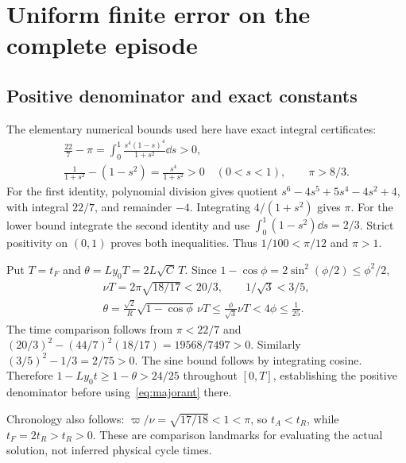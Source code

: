 \section{Uniform finite error on the complete episode}\label{sec:error}
\subsection{Positive denominator and exact constants}\label{sec:constants}
The elementary numerical bounds used here have exact integral certificates:
\begin{equation}\label{eq:pibounds}%
\begin{gathered}
 \frac{22}{7}-\pi
 =\int_0^1\frac{s^4(1-s)^4}{1+s^2}\dd s>0,\\
 \frac1{1+s^2}-(1-s^2)=\frac{s^4}{1+s^2}>0
 \quad(0<s<1),\qquad \pi>8/3 .
\end{gathered}
\end{equation}
For the first identity, polynomial division gives quotient
$s^6-4s^5+5s^4-4s^2+4$, with integral $22/7$, and remainder $-4$.
Integrating $4/(1+s^2)$ gives $\pi$. For the lower bound integrate the second identity and use $\int_0^1(1-s^2)\dd s=2/3$. Strict positivity on $(0,1)$ proves both inequalities. Thus $1/100<\pi/12$ and $\pi>1$.

Put $T=t_F$ and $\theta=Ly_0T=2L\sqrt C\,T$. Since
$1-\cos\phi=2\sin^2(\phi/2)\le\phi^2/2$,
\begin{equation}\label{eq:theta}%
\begin{gathered}
 \nu T=2\pi\sqrt{18/17}<20/3,\qquad 1/\sqrt3<3/5,\\
 \theta=\frac{\sqrt2}{R}\sqrt{1-\cos\phi}\,\nu T
 \le\frac{\phi}{\sqrt3}\nu T<4\phi\le\frac1{25}.
\end{gathered}
\end{equation}
The time comparison follows from $\pi<22/7$ and
$(20/3)^2-(44/7)^2(18/17)=19568/7497>0$.
Similarly $(3/5)^2-1/3=2/75>0$. The sine bound follows by integrating cosine. Therefore $1-Ly_0t\ge1-\theta>24/25$ throughout $[0,T]$, establishing the positive denominator before using~\eqref{eq:majorant} there.

Chronology also follows: $\varpi/\nu=\sqrt{17/18}<1<\pi$, so
$t_A<t_R$, while $t_F=2t_R>t_R>0$. These are comparison landmarks for evaluating the actual solution, not inferred physical cycle times.

